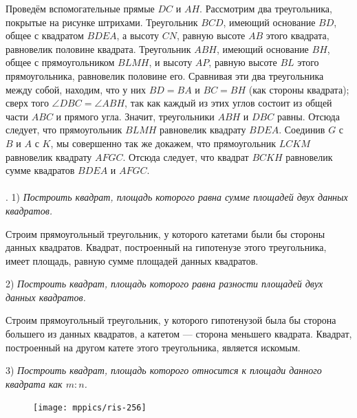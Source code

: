 \documentclass[oneside]{book}
\begin{document}
Проведём вспомогательные прямые $DC$ и $AH$.
Рассмотрим два треугольника, покрытые на рисунке штрихами.
Треугольник $BCD$, имеющий основание $BD$, общее с квадратом $BDEA$, а высоту $CN$, %
равную высоте $AB$ этого квадрата, равновелик половине квадрата.
Треугольник $ABH$, имеющий основание $BH$, общее с прямоугольником $BLMH$, и высоту $AP$, %
равную высоте $BL$ этого прямоугольника, равновелик половине его.
Сравнивая эти два треугольника между собой, находим, что у них $BD = BA$ и $BC=BH$ (как стороны квадрата);
сверх того $\angle DBC=\angle ABH$, так как каждый из этих углов состоит из общей части $ABC$ и прямого угла.
Значит, треугольники $ABH$ и $DBC$ равны.
Отсюда следует, что прямоугольник $BLMH$ равновелик квадрату $BDEA$.
Соединив $G$ с $B$ и $A$ с $K$, мы совершенно так же докажем, что прямоугольник $LCKM$ равновелик квадрату $AFGC$.
Отсюда следует, что квадрат $BCKH$ равновелик сумме квадратов $BDEA$ и $AFGC$.


\paragraph{}\label{1938/258}
.
1) \emph{Построить квадрат, площадь которого равна сумме площадей двух данных квадратов.}

Строим прямоугольный треугольник, у которого катетами были бы стороны данных квадратов.
Квадрат, построенный на гипотенузе этого треугольника, имеет площадь, равную сумме площадей данных квадратов.

2) \emph{Построить квадрат, площадь которого равна разности площадей двух данных квадратов.}

Строим прямоугольный треугольник, у которого гипотенузой была бы сторона большего из данных квадратов, а катетом — сторона меньшего квадрата.
Квадрат, построенный на другом катете этого треугольника, является искомым.

3) \emph{Построить квадрат, площадь которого относится к площади данного квадрата как $m:n$.}

\begin{figure}
\centering
\texttt{[image: mppics/ris-256]}
\caption{}\label{1938/ris-256}
\end{figure}
\end{document}
